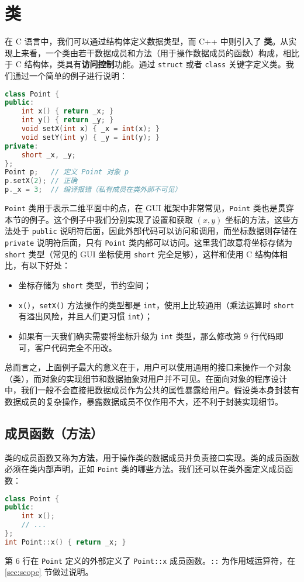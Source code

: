 \documentclass[hyperref,UTF8]{article}
\begin{document}
\section{类}

在 C 语言中，我们可以通过结构体定义数据类型，而 C++ 中则引入了 \textbf{类}。从实现上来看，一个类由若干数据成员和方法（用于操作数据成员的函数）构成，相比于 C 结构体，类具有\textbf{访问控制}功能。通过 \texttt{struct} 或者 \texttt{class} 关键字定义类。我们通过一个简单的例子进行说明：
\begin{lstlisting}[language=c++]
class Point {
public:
    int x() { return _x; }
    int y() { return _y; }
    void setX(int x) { _x = int(x); }
    void setY(int y) { _y = int(y); }
private:
    short _x, _y;
};
Point p;   // 定义 Point 对象 p
p.setX(2); // 正确
p._x = 3;  // 编译报错（私有成员在类外部不可见）
\end{lstlisting}
\texttt{Point} 类用于表示二维平面中的点，在 GUI 框架中非常常见，\texttt{Point} 类也是贯穿本节的例子。这个例子中我们分别实现了设置和获取 $(x, y)$ 坐标的方法，这些方法处于 \texttt{public} 说明符后面，因此外部代码可以访问和调用，而坐标数据则存储在 \texttt{private} 说明符后面，只有 \texttt{Point} 类内部可以访问。这里我们故意将坐标存储为 \texttt{short} 类型（常见的 GUI 坐标使用 \texttt{short} 完全足够），这样和使用 C 结构体相比，有以下好处：
\begin{itemize}
  \item 坐标存储为 \texttt{short} 类型，节约空间；
  \item \texttt{x()}，\texttt{setX()} 方法操作的类型都是 \texttt{int}，使用上比较通用（乘法运算时 \texttt{short} 有溢出风险，并且人们更习惯 \texttt{int}）；
  \item 如果有一天我们确实需要将坐标升级为 \texttt{int} 类型，那么修改第 9 行代码即可，客户代码完全不用改。
\end{itemize}
总而言之，上面例子最大的意义在于，用户可以使用通用的接口来操作一个对象（类），而对象的实现细节和数据抽象对用户并不可见。在面向对象的程序设计中，我们一般不会直接把数据成员作为公共的属性暴露给用户。假设类本身封装有数据成员的复杂操作，暴露数据成员不仅作用不大，还不利于封装实现细节。

\subsection{成员函数（方法）}

类的成员函数又称为\textbf{方法}，用于操作类的数据成员并负责接口实现。类的成员函数必须在类内部声明，正如 \texttt{Point} 类的哪些方法。我们还可以在类外面定义成员函数：
\begin{lstlisting}[language=c++]
class Point {
public:
    int x();
    // ...
};
int Point::x() { return _x; }
\end{lstlisting}
第 6 行在 \texttt{Point} 定义的外部定义了 \texttt{Point::x} 成员函数。\texttt{::} 为作用域运算符，在 \ref{sec:scope} 节做过说明。
\end{document}
